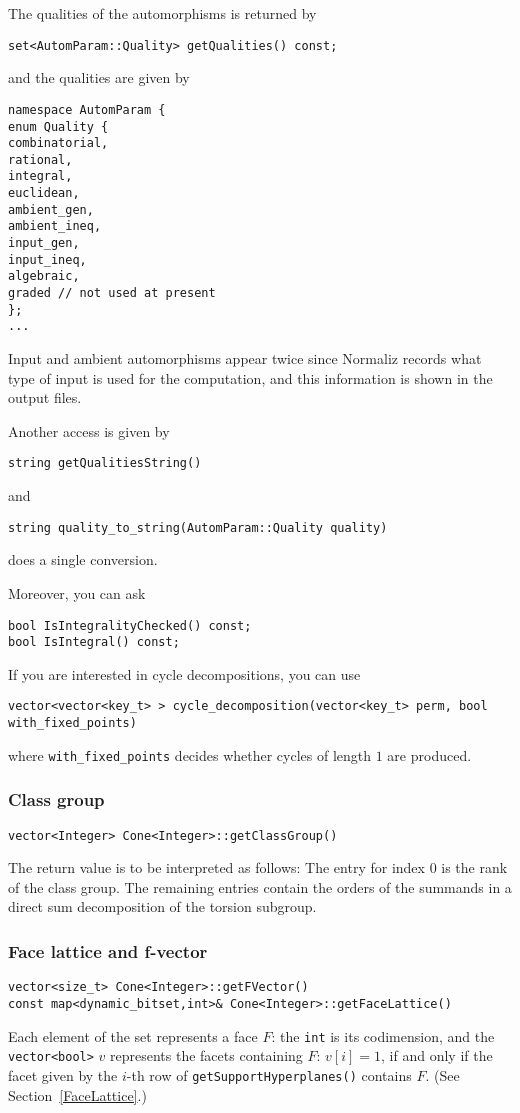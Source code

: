\documentclass[12pt,a4paper]{scrartcl}
\theoremstyle{definition}
\begin{document}
\begin{small}
The qualities of the automorphisms is returned by
\begin{Verbatim}
set<AutomParam::Quality> getQualities() const;
\end{Verbatim}
and the qualities are given by
\begin{Verbatim} 
namespace AutomParam {
enum Quality {
combinatorial,
rational,
integral,
euclidean,
ambient_gen,
ambient_ineq,
input_gen,
input_ineq,
algebraic,
graded // not used at present
};
...
\end{Verbatim}
Input and ambient automorphisms appear twice since Normaliz records what type of input is used for the computation, and this information is shown in the output files.

Another access is given by
\begin{Verbatim}
string getQualitiesString()
\end{Verbatim}
and
\begin{Verbatim}
string quality_to_string(AutomParam::Quality quality)
\end{Verbatim}
does a single conversion.

Moreover, you can ask
\begin{Verbatim}
bool IsIntegralityChecked() const;
bool IsIntegral() const;
\end{Verbatim}

If you are interested in cycle decompositions, you can use
\begin{Verbatim}
vector<vector<key_t> > cycle_decomposition(vector<key_t> perm, bool with_fixed_points)
\end{Verbatim}
where \verb|with_fixed_points| decides whether cycles of length $1$ are produced.

\subsubsection{Class group}

\begin{Verbatim}
vector<Integer> Cone<Integer>::getClassGroup()
\end{Verbatim}
The return value is to be interpreted as follows: The entry for index $0$ is the rank of the class group. The remaining entries contain the orders of the summands in a direct sum decomposition of the torsion subgroup.

\subsubsection{Face lattice and f-vector}
\begin{Verbatim}
vector<size_t> Cone<Integer>::getFVector()
const map<dynamic_bitset,int>& Cone<Integer>::getFaceLattice()
\end{Verbatim}
Each element of the set represents a face $F$: the \verb|int| is its codimension, and the \verb|vector<bool>| $v$ represents the facets containing $F$: $v[i]=1$, if and only if the facet given by the $i$-th row of \verb|getSupportHyperplanes()| contains $F$. (See Section~\ref{FaceLattice}.)


\end{small}
\end{document}
